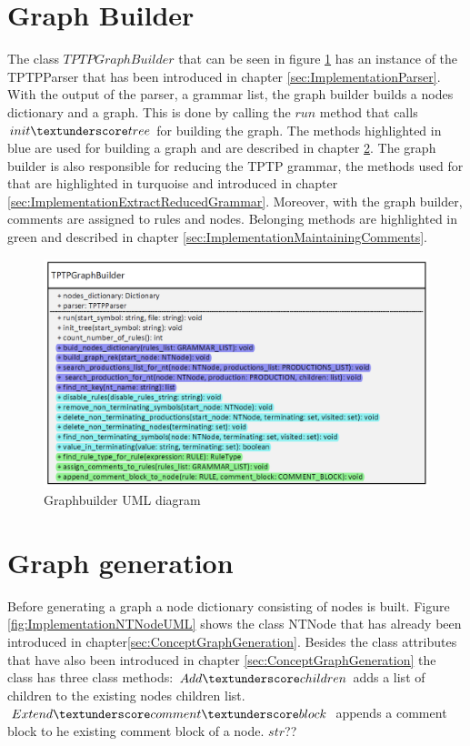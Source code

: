 \section{Graph Builder}\label{sec:ImplementationGraphBuilder}

The class $TPTPGraphBuilder$ that can be seen in figure \ref{fig:ImplementationGraphbuilderUML} has an instance of the TPTPParser that has been introduced in chapter \ref{sec:ImplementationParser}. With the output of the parser, a grammar list, the graph builder builds a nodes dictionary and a graph. This is done by calling the $run$ method that calls $init\textunderscore tree$ for building the graph.
The methods highlighted in blue are used for building a graph and are described in chapter \ref{sec:ImplementationGraphGeneration}. The graph builder is also responsible for reducing the \ac{TPTP} grammar, the methods used for that are highlighted in turquoise and introduced in chapter \ref{sec:ImplementationExtractReducedGrammar}. Moreover, with the graph builder, comments are assigned to rules and nodes. Belonging methods are highlighted in green and described in chapter \ref{sec:ImplementationMaintainingComments}.

\begin{figure}[H]
\centering
\includegraphics[width=1 \textwidth]{images/uml_graphbuilder.png}
\caption{Graphbuilder UML diagram}
\label{fig:ImplementationGraphbuilderUML}
\end{figure}                
                
\section{Graph generation}\label{sec:ImplementationGraphGeneration}

Before generating a graph a node dictionary consisting of nodes is built. Figure \ref{fig:ImplementationNTNodeUML} shows the class NTNode that has already been introduced in chapter\ref{sec:ConceptGraphGeneration}. Besides the class attributes that have also been introduced in chapter \ref{sec:ConceptGraphGeneration} the class has three class methods:
$Add\textunderscore children$ adds a list of children to the existing nodes children list. $Extend\textunderscore comment\textunderscore block$ appends a comment block to he existing comment block of a node. $str$?? 

